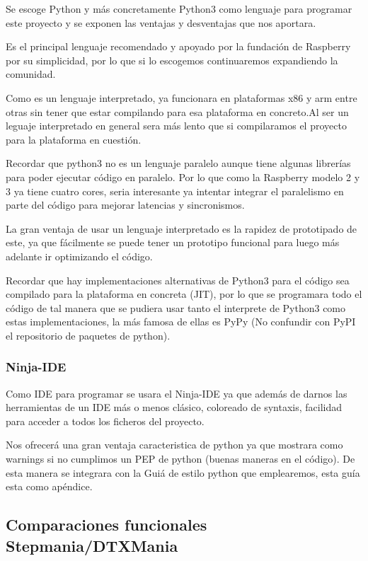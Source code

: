 \documentclass[a4paper,11pt,oneside]{book}
\begin{document}
Se escoge Python y más concretamente Python3 como lenguaje para programar este proyecto y se exponen las ventajas y desventajas que nos aportara.

Es el principal lenguaje recomendado y apoyado por la fundación de Raspberry por su simplicidad, por lo que si lo escogemos continuaremos expandiendo la comunidad.

Como es un lenguaje interpretado, ya funcionara en plataformas x86 y arm entre otras sin tener que estar compilando para esa plataforma en concreto.Al ser un leguaje interpretado en general sera más lento que si compilaramos el proyecto para la plataforma en cuestión.

Recordar que python3 no es un lenguaje paralelo aunque tiene algunas librerías para poder ejecutar código en paralelo. Por lo que como la Raspberry modelo 2 y 3 ya tiene cuatro cores, seria interesante ya intentar integrar el paralelismo en parte del código para mejorar latencias y sincronismos.

La gran ventaja de usar un lenguaje interpretado es la rapidez de prototipado de este, ya que fácilmente se puede tener un prototipo funcional para luego más adelante ir optimizando el código.

Recordar que hay implementaciones alternativas de Python3 para el código sea compilado para la plataforma en concreta (JIT), por lo que se programara todo el código de tal manera que se pudiera usar tanto el interprete de Python3 como estas implementaciones, la más famosa de ellas es PyPy (No confundir con PyPI el repositorio de paquetes de python).

\subsubsection{Ninja-IDE}
Como IDE para programar se usara el Ninja-IDE ya que además de darnos las herramientas de un IDE más o menos clásico, coloreado de syntaxis, facilidad para acceder a todos los ficheros del proyecto. 

Nos ofrecerá una gran ventaja caracteristica de python ya que mostrara como warnings si no cumplimos un PEP de python (buenas maneras en el código).
De esta manera se integrara con la Guiá de estilo python que emplearemos, esta guía esta como apéndice.


\subsection{Comparaciones funcionales Stepmania/DTXMania}
\end{document}
